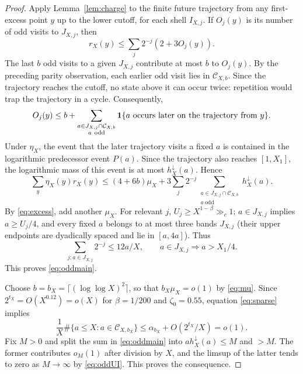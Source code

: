 \begin{proof}
Apply Lemma~\ref{lem:charge} to the finite future trajectory
from any first-excess point $y$ up to the lower cutoff, for each
shell $I_{X,j}$.  If $O_j(y)$ is its number of odd visits to
$J_{X,j}$, then
\[
 r_X(y)\le\sum_j2^{-j}(2+3O_j(y)).
\]
The last $b$ odd visits to a given $J_{X,j}$ contribute at most $b$
to $O_j(y)$.  By the preceding parity observation, each earlier
odd visit lies in $\mathcal C_{X,b}$.  Since the trajectory reaches
the cutoff, no state above it can occur twice: repetition would
trap the trajectory in a cycle.  Consequently,
\[
 O_j(y)\le b+
 \sum_{\substack{a\in J_{X,j}\cap\mathcal C_{X,b}\\a\ \mathrm{odd}}}
 \mathbf1\{a\text{ occurs later on the trajectory from }y\}.
\]
Under $\eta_X$, the event that the later trajectory visits a fixed
$a$ is contained in the logarithmic predecessor event $P(a)$.
Since the trajectory also reaches $[1,X_1]$, the logarithmic mass
of this event is at most $h_X^{\downarrow}(a)$.  Hence
\[
 \sum_y\eta_X(y)r_X(y)
 \le (4+6b)\mu_X+
 3\sum_j2^{-j}\sum_{\substack{a\in J_{X,j}\cap\mathcal C_{X,b}\\
 a\ \mathrm{odd}}}h_X^{\downarrow}(a).
\]
By \eqref{eq:excess}, add another $\mu_X$.
For relevant $j$, $U_j\ge X^{1-\beta}\gg_c1$;
$a\in J_{X,j}$ implies $a\ge U_j/4$, and every fixed $a$
belongs to at most three bands $J_{X,j}$ (their upper endpoints
are dyadically spaced and lie in $[a,4a]$).  Thus
\[
 \sum_{j:a\in J_{X,j}}2^{-j}\le12a/X,
 \qquad a\in J_{X,j}\Longrightarrow a>X_1/4.
\]
This proves \eqref{eq:oddmain}.

Choose $b=b_X=\lceil(\log\log X)^2\rceil$, so that
$b_X\mu_X=o(1)$ by \eqref{eq:mu}.  Since
$2^{t_X}=O(X^{0.12})=o(X)$ for $\beta=1/200$ and
$\zeta_0=0.55$, equation \eqref{eq:sparse} implies
\[
 \frac1X\#\{a\le X:a\in\mathcal C_{X,b_X}\}
 \le\alpha_{b_X}+O(2^{t_X}/X)=o(1).
\]
Fix $M>0$ and split the sum in \eqref{eq:oddmain} into
$a h_X^{\downarrow}(a)\le M$ and $>M$.  The former contributes
$o_M(1)$ after division by $X$, and the limsup of the latter tends
to zero as $M\to\infty$ by \eqref{eq:oddUI}.  This proves the
consequence.
\end{proof}


